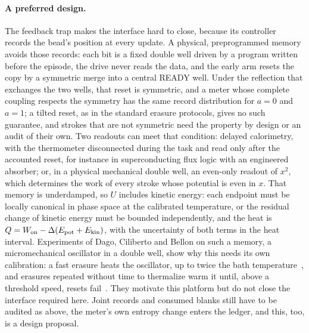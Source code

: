 \paragraph{A preferred design.} The feedback trap makes the interface hard to close, because its controller records the bead's position at every update. A physical, preprogrammed memory avoids those records: each bit is a fixed double well driven by a program written before the episode, the drive never reads the data, and the early arm resets the copy by a symmetric merge into a central READY well. Under the reflection that exchanges the two wells, that reset is symmetric, and a meter whose complete coupling respects the symmetry has the same record distribution for $a=0$ and $a=1$; a tilted reset, as in the standard erasure protocols, gives no such guarantee, and strokes that are not symmetric need the property by design or an audit of their own. Two readouts can meet that condition: delayed calorimetry, with the thermometer disconnected during the task and read only after the accounted reset, for instance in superconducting flux logic with an engineered absorber; or, in a physical mechanical double well, an even-only readout of $x^2$, which determines the work of every stroke whose potential is even in $x$. That memory is underdamped, so $U$ includes kinetic energy: each endpoint must be locally canonical in phase space at the calibrated temperature, or the residual change of kinetic energy must be bounded independently, and the heat is $Q=W_{\rm on}-\Delta(E_{\rm pot}+E_{\rm kin})$, with the uncertainty of both terms in the heat interval. Experiments of Dago, Ciliberto and Bellon on such a memory, a micromechanical oscillator in a double well, show why this needs its own calibration: a fast erasure heats the oscillator, up to twice the bath temperature~\cite{DagoCilibertoBellon23}, and erasures repeated without time to thermalize warm it until, above a threshold speed, resets fail~\cite{DagoCilibertoBellon24}. They motivate this platform but do not close the interface required here. Joint records and consumed blanks still have to be audited as above, the meter's own entropy change enters the ledger, and this, too, is a design proposal.

